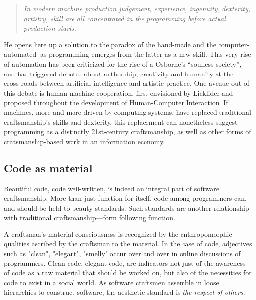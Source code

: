 \documentclass{article}
\begin{document}
\begin{quote}
    \textit{In modern machine production judgement, experience, ingenuity, dexterity, artistry, skill are all concentrated in the programming before actual production starts.\cite{osborne_aesthetic_1977}}
\end{quote}

He opens here up a solution to the paradox of the hand-made and the computer-automated, as programming emerges from the latter as a new skill. This very rise of automation has been criticized for the rise of a Osborne's ``soulless society''\cite{osborne_aesthetic_1977}, and has triggered debates about authorship, creativity and humanity at the cross-roads between artificial intelligence and artistic practice\cite{mazzone_art_2019}. One avenue out of this debate is human-machine cooperation, first envisioned by Licklider and proposed throughout the development of Human-Computer Interaction\cite{licklider_man-computer_1960,grudin_tool_2016}. If machines, more and more driven by computing systems, have replaced traditional craftsmanship's skills and dexterity, this replacement can nonetheless suggest programming as a distinctly 21st-century craftsmanship, as well as other forms of cratsmanship-based work in an information economy.

\subsection{Code as material}

Beautiful code, code well-written, is indeed an integral part of software craftsmanship\cite{oram_beautiful_2007}. More than just function for itself, code among programmers can, and should be held to beauty standards\cite{pineiro_aesthetics_2003}. Such standards are another relationship with traditional craftsmanship---form following function.

A craftsman's material consciousness is recognized by the anthropomorphic qualities ascribed by the craftsman to the material\cite{sennett_craftsman_2009}. In the case of code, adjectives such as "clean", "elegant", "smelly" occur over and over in online discussions of programmers. Clean code, elegant code, are indicators not just of the awareness of code as a raw material that should be worked on, but also of the necessities for code to exist in a social world. As software craftsmen assemble in loose hierarchies to construct software, the aesthetic standard is \emph{the respect of others}\cite{abelson_structure_1979}.
\end{document}
